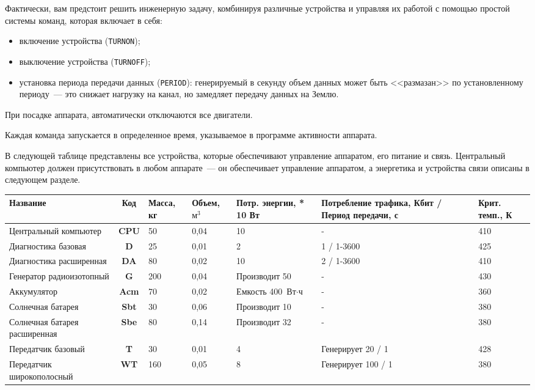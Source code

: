 \documentclass[12pt,a4paper]{article}
\begin{document}
Фактически, вам предстоит решить инженерную задачу, комбинируя различные устройства и
управляя их работой с помощью простой системы команд, которая включает в себя:

\begin{itemize}
\item включение устройства (\verb'TURNON');
\item выключение устройства (\verb'TURNOFF');
\item установка периода передачи данных (\verb'PERIOD'): генерируемый в секунду объем данных
  может быть <<размазан>> по установленному периоду~--- это снижает нагрузку на канал, но
  замедляет передачу данных на Землю.
\end{itemize}
  
При посадке аппарата, автоматически отключаются все двигатели.

Каждая команда запускается в определенное время, указываемое в программе активности
аппарата.

В следующей таблице представлены все устройства, которые обеспечивают управление
аппаратом, его питание и связь. Центральный компьютер должен присутствовать в любом
аппарате~--- он обеспечивает управление аппаратом, а энергетика и устройства связи описаны
в следующем разделе.

\begin{center}
\begin{tabular}{ |p{3cm}|c|p{1.5cm}|p{1.5cm}|p{2.5cm}|p{3cm}|p{1.5cm}| } 
  \hline
  \textbf{Название} & \textbf{Код} & \textbf{Масса, кг} & \textbf{Объем, $\text{м}^3$} &
  \textbf{Потр. энергии, * 10 Вт} & \textbf{Потребление трафика, Кбит / Период передачи,
    с} & \textbf{Крит. темп., К}\\
  \hline
  Центральный компьютер & \textbf{CPU} & 50 & 0,04 & 10 & - & 410 \\
  \hline
  Диагностика базовая & \textbf{D} & 25 & 0,01 & 2 & 1 / 1-3600 & 425 \\
  \hline
  Диагностика расширенная & \textbf{DA} & 80 & 0,02 & 10 & 2 / 1-3600 & 410\\
  \hline
  Генератор радиоизотопный & \textbf{G} & 200 & 0,04 & Производит 50 & - & 430\\
  \hline
  Аккумулятор & \textbf{Acm} & 70 & 0,02 & Емкость 400 $\text{Вт}\cdot\text{ч}$& - & 360\\
  \hline
  Солнечная батарея & \textbf{Sbt} & 30 & 0,06 & Производит 10 & - & 380\\
  \hline
  Солнечная батарея расширенная & \textbf{Sbe} & 80 & 0,14 & Производит 32 & - & 380\\
  \hline
  Передатчик базовый & \textbf{T} & 30 & 0,01 & 4 & Генерирует 20 / 1 & 428\\
  \hline
  Передатчик широкополосный & \textbf{WT} & 160 & 0,05 & 8 & Генерирует 100 / 1 & 380\\
  \hline
\end{tabular}
\end{center}
\end{document}
